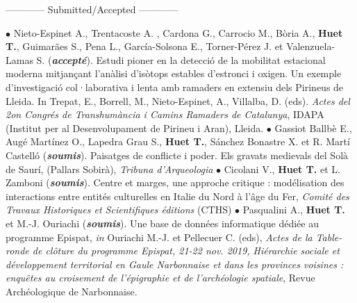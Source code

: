 \documentclass{article}
\newcommand{\fr}[1]{}       %
\newcommand{\en}[1]{#1}     %
\begin{document}
\smallbreak
\fr{\begin{center}------------ Soumis/Accepté ------------\end{center}}\en{{\begin{center}------------ Submitted/Accepted ------------\end{center}}}
\smallbreak
$\bullet$ Nieto-Espinet A., Trentacoste A. , Cardona G., Carrocio M.,  Bòria A., \textbf{Huet T.}, Guimarães S., Pena L., García-Solsona E., Torner-Pérez J. et  Valenzuela-Lamas S. (\textit{\textbf{accepté}}). Estudi pioner en la detecció de la mobilitat estacional moderna mitjançant l'anàlisi d'isòtops estables d'estronci i oxigen. Un exemple d'investigació col·laborativa i lenta amb ramaders en extensiu dels Pirineus de Lleida. In Trepat, E., Borrell, M., Nieto-Espinet, A., Villalba, D. (eds). \textit{Actes del 2on Congrés de Transhumància i Camins Ramaders de Catalunya}, IDAPA (Institut per al Desenvolupament de Pirineu i Aran), Lleida. 
\smallbreak
$\bullet$ Gassiot Ballbè E., Augé Martínez O., Lapedra Grau S., \textbf{Huet T.}, Sánchez Bonastre X. et R. Martí Castelló (\textit{\textbf{soumis}}). Paisatges de conflicte i poder. Els gravats medievals del Solà de Saurí, (Pallars Sobirà), \textit{Tribuna d'Arqueologia}
\smallbreak
$\bullet$ Cicolani V., \textbf{Huet T.} et L. Zamboni (\textit{\textbf{soumis}}). Centre et marges, une approche critique : modélisation des interactions entre entités culturelles en Italie du Nord à l'âge du Fer, \textit{Comit\'{e} des Travaux Historiques et Scientifiques \'{e}ditions} (CTHS)
\smallbreak
$\bullet$ Pasqualini A., \textbf{Huet T.} et M.-J. Ouriachi (\textit{\textbf{soumis}}). Une base de données informatique dédiée au programme Epispat, \textit{in} Ouriachi M.-J. et Pellecuer C. (eds), \textit{Actes de la Table-ronde de cl\^{o}ture du programme Epispat, 21-22 nov. 2019, Hi\'{e}rarchie sociale et d\'{e}veloppement territorial en Gaule Narbonnaise et dans les provinces voisines : enqu\^{e}tes au croisement de l'\'{e}pigraphie et de l'arch\'{e}ologie spatiale}, Revue Arch\'{e}ologique de Narbonnaise.
\smallbreak
\end{document}
